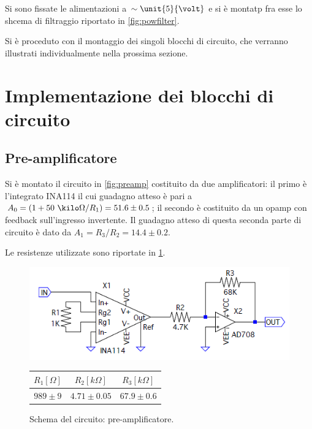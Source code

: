 \documentclass[a4paper,10pt]{article}
\begin{document}
Si sono fissate le alimentazioni a $\sim \unit{5}{\volt}$ e si è montatp fra esse lo shcema di filtraggio riportato in  \cref{fig:powfilter}.

Si è proceduto con il montaggio dei singoli blocchi di circuito, che verranno illustrati individualmente nella prossima sezione.

\vspace*{-10pt}

\section{Implementazione dei blocchi di circuito}

\subsection{Pre-amplificatore}

Si è montato il circuito in \cref{fig:preamp} costituito da due amplificatori: il primo è l'integrato INA114 il cui guadagno atteso è pari a $ A_0 = (1+ 50~\kilo\Omega/R_1) = 51.6 \pm 0.5$; il secondo è costituito da un opamp con feedback sull'ingresso invertente. Il guadagno atteso di questa seconda parte di circuito è dato da $A_1 = R_3/R_2 = 14.4 \pm 0.2 $.

Le resistenze utilizzate sono riportate in \cref{tab:resistenze}.

\vspace*{-10pt}

\begin{figure}[H]
	\begin{minipage}{0.59\textwidth}
		\centering
		\includegraphics[width=\textwidth]{../grafici/PreAmp.png}
		\vspace{-12pt}
		\caption{Schema del circuito: pre-amplificatore.}
		\label{fig:preamp}
	\end{minipage}
	\begin{minipage}{0.39\textwidth}
		\centering
		\begin{tabular}{ccc}
			\hline
			$R_1[\Omega]$ & $R_2[k\Omega]$ & $R_3[k\Omega]$\\
			\hline
			$989\pm9$ & $4.71\pm0.05$ & $67.9\pm0.6$\\
			\hline
		\end{tabular}
		\label{tab:resistenze}
	\end{minipage}
\end{figure}
\end{document}

